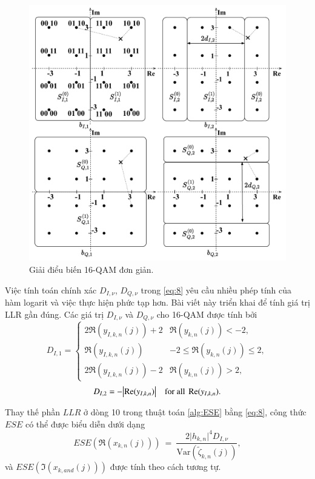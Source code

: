 \begin{figure}
    \centering
        \includegraphics[width=0.75\linewidth]{figure/Chap2/16-QAM.pdf}
    \caption{Giải điểu biến 16-QAM đơn giản.}
    \label{fig:16-QAM}
    \vspace{-1em}
\end{figure}

Việc tính toán chính xác $D_{I,\nu}$, $D_{Q,\nu}$ trong \eqref{eq:8} yêu cầu nhiều phép tính của hàm logarit và việc thực hiện phức tạp hơn. Bài viết này triển khai \cite{SimpleDemap} để tính giá trị LLR gần đúng. Các giá trị $D_{I,\nu}$ và $D_{Q,\nu}$ cho 16-QAM được tính bởi
\begin{equation}
    D_{I,1}=\left\{
        \begin{matrix}
            2\Re(y_{I,k,n}(j))+2 & \Re(y_{k,n}(j)) < -2, \\ 
             \Re(y_{I,k,n}(j))   & -2\leq \Re(y_{k,n}(j)) \leq 2, \\ 
            2\Re(y_{I,k,n}(j))-2 & \Re(y_{k,n}(j)) > 2, 
        \end{matrix}
    \right. \label{eq:9}
\end{equation}
\begin{equation}
    \begin{matrix}
        D_{I,2}=-\absolutevalue{\Re(y_{I,k,n})} & \text{for all } \Re(y_{I,k,n}).
    \end{matrix}
    \label{eq:10}
\end{equation}

Thay thế phần $LLR$ ở dòng 10 trong thuật toán \ref{alg:ESE} bằng \eqref{eq:8}, công thức $ESE$ có thể được biểu diễn dưới dạng 
\begin{equation}
    ESE(\Re(x_{k,n}(j)))~=~\dfrac{2\lvert h_{k,n}\rvert^4D_{I,\nu}}
    {\text{Var}(\tilde{\zeta}_{k,n}(j))},
\end{equation}  
và $ESE(\Im(x_{k,and}(j)))$ được tính theo cách tương tự.


